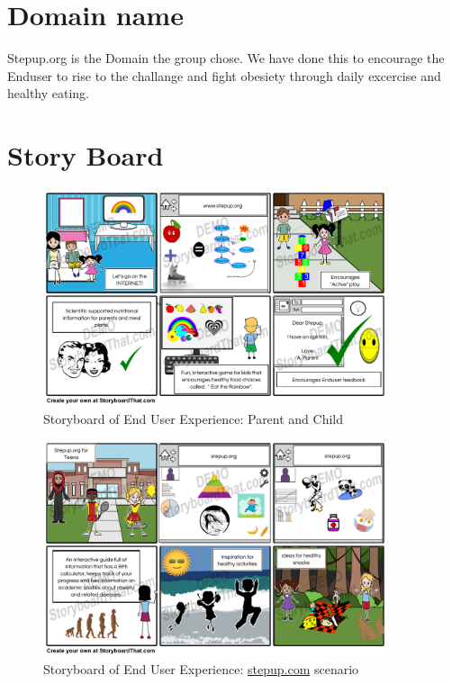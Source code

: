 \documentclass[letterpaper,12pt]{article}
\begin{document}
\section{Domain name}

Stepup.org is the Domain the group chose. We have done this to encourage the Enduser to rise to the challange and fight obesiety through daily excercise and healthy eating.

\section{Story Board}

\begin{figure}[ht!]
  \centering
  \includegraphics[width=0.9\textwidth]{assets/jpg/parent_and_children_experience}
  \caption{Storyboard of End User Experience: Parent and Child}
  \label{fig:parent-and-children-experience}
\end{figure}
\FloatBarrier
\begin{figure}[ht!]
  \centering
  \includegraphics[width=0.9\textwidth]{assets/jpg/stepup_com_scenario_2}
  \caption{Storyboard of End User Experience: \url{stepup.com} scenario}
  \label{fig:stepup-com-scenario-2}
\end{figure}
\FloatBarrier
\end{document}
